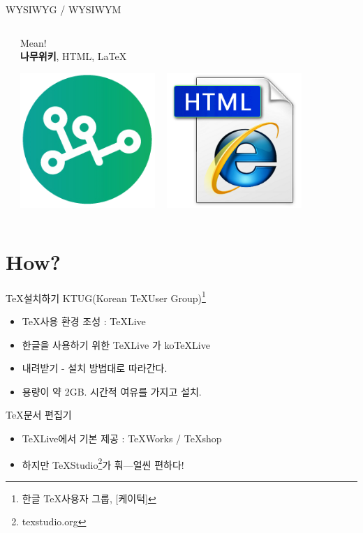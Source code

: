 \documentclass[12pt]{beamer}
\begin{document}
\begin{frame}{WYSIWYG / WYSIWYM}
\begin{columns}
\begin{column}{0.5\textwidth}
		\end{column}
		\begin{column}{0.5\textwidth}
			Mean! \\
			\vfill
			\textbf{나무위키}, HTML, \LaTeX \\
			\begin{center}
				\includegraphics[width=0.4\textwidth]{namu.png}
				~
				\includegraphics[width=0.4\textwidth]{htmlicon.png}
			\end{center}
		\end{column}
	\end{columns}
\end{frame}
\section{How?}
\begin{frame}{\TeX 설치하기}
	KTUG(Korean \TeX User Group)\footnote{한글 \TeX 사용자 그룹, [케이턱]}
	\begin{itemize}
		\item \TeX 사용 환경 조성 : TeXLive
		\item 한글을 사용하기 위한 TeXLive 가 koTeXLive
		\item 내려받기 - 설치 방법대로 따라간다.
		\item 용량이 약 2GB. 시간적 여유를 가지고 설치.
	\end{itemize}
	\TeX 문서 편집기
	\begin{itemize}
		\item TeXLive에서 기본 제공 : TeXWorks / TeXshop
		\item 하지만 TeXStudio\footnote{texstudio.org}가 훠---얼씬 편하다!
	\end{itemize}
\end{frame}
\end{document}
